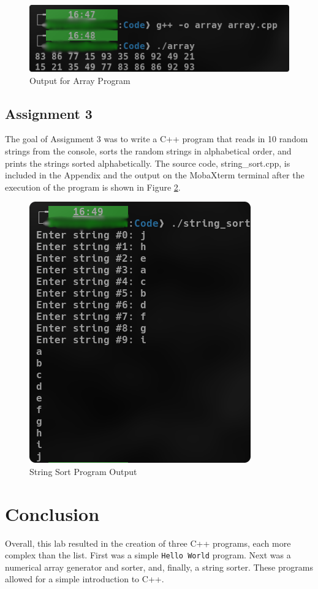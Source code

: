 \documentclass[
	letterpaper, %
	10pt, %
]{CSUniSchoolLabReport}
\begin{document}
\begin{figure}[H]
  \centering
  \includegraphics[width=.9\textwidth]{Figures/Assignment2.png}
  \caption{Output for Array Program}
  \label{fig:5}
\end{figure}

\subsection{Assignment 3}

\hspace{.5 in} The goal of Assignment 3 was to write a C++ program that reads in 10 random strings from the console, sorts the random strings in alphabetical order, and prints the strings sorted alphabetically. The source code, string\_sort.cpp, is included in the Appendix and the output on the MobaXterm terminal after the execution of the program is shown in Figure \ref{fig:6}.

\begin{figure}[H]
  \centering
  \includegraphics[width=.5\textwidth]{Figures/Assignment3.png}
  \caption{String Sort Program Output}
  \label{fig:6}
\end{figure}

\section{Conclusion}

\hspace{.5 in} Overall, this lab resulted in the creation of three C++ programs, each more complex than the list. First was a simple \texttt{Hello World} program. Next was a numerical array generator and sorter, and, finally, a string sorter. These programs allowed for a simple introduction to C++.
\end{document}
